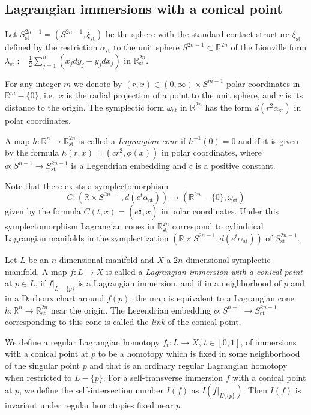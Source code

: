 \documentclass[reqno,11pt]{amsart}
\numberwithin{equation}{section}
\theoremstyle{my}
\theoremstyle{my}
\theoremstyle{your}
\newcommand{\R}{\mathbb{R}}
\newcommand{\st}{\mathrm{st}}
\newcommand{\om}{\omega}
\begin{document}
\subsection{Lagrangian immersions with a conical point}
 Let $S^{2n-1}_\st=(S^{2n-1},\xi_\st)$  be  the  sphere with the standard contact structure  $\xi_\st$ defined by the restriction 
 $\alpha_\st$  to the unit sphere $S^{2n-1}\subset\R^{2n}$ of   the Liouville form $\lambda_\st:=\frac12\sum_{j=1}^n(x_jdy_j-y_jdx_j)$ in $\R^{2n}_\st$.
 
For any integer $m$ we denote by 
$(r,x)\in (0,\infty)\times S^{m-1}$   polar coordinates in
$\R^{m}-\{0\}$, i.e.~$x$ is the radial projection of a point
to the unit sphere, and $r$ is its distance to the origin.  The 
symplectic form $\omega_\st$ in $\R^{2n}$ has the form $d(r^2\alpha_\st)$ in polar coordinates.

A map $h\colon\R^n\to\R^{2n}_\st$ is called a \emph{Lagrangian cone} if $h^{-1}(0)=0$ and   if it is given by the formula
$h(r,x)=(cr^2,\phi(x))$ in polar coordinates, where $\phi\colon S^{n-1}\to S^{2n-1}_\st$ is a Legendrian embedding and $c$ is a positive constant.
 
Note that there exists a symplectomorphism
\begin{equation}\label{eq:symlectization-cone}
 C\colon (\R\times S^{2n-1}, d(e^t\alpha_\st))\to (\R^{2n}-\{0\},\om_\st)
\end{equation}
given by the formula
 $C(t,x)=\left(e^{\frac t2},x\right)$ in polar coordinates. Under this symplectomorphism
 Lagrangian cones in $\R^{2n}_\st$ correspond to cylindrical Lagrangian manifolds in the symplectization $(\R\times S^{2n-1}, d(e^t\alpha_\st))$ of $S^{2n-1}_\st$.

 


Let $L$ be an $n$-dimensional manifold and $X$ a $2n$-dimensional symplectic manifold.
A map $f\colon L\to X$ is called a \emph{Lagrangian immersion with a conical point} at $p\in L$, if $f|_{L-\{p\}}$ is a Lagrangian immersion, and if in a neighborhood of $p$ and in a Darboux chart  around $f(p)$, the map is equivalent to a Lagrangian cone $h\colon\R^n\to \R^{2n}_{\st}$ near the origin. The Legendrian   embedding   $\phi\colon S^{n-1}\to S^{2n-1}_\st$ corresponding to this cone is called  the \emph{link} of the conical point.

We define a regular Lagrangian homotopy $f_t\colon L\to X$, $t\in[0,1]$, of immersions with a conical point at $p$ to be a homotopy which is  fixed in some neighborhood of the singular point $p$ and that is an ordinary regular Lagrangian homotopy when restricted to $L-\{p\}$.  
For a self-transverse immersion $f$ with a conical point at $p$, we define the self-intersection    number $I(f)$ as $I(f|_{L\setminus\{p\}})$. Then $I(f)$ is invariant under regular homotopies fixed near $p$. 
\end{document}
